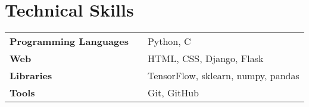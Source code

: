 \documentclass[10pt]{article}
\newenvironment{zitemize}{
\begin{itemize}\itemsep2pt \parskip0pt \parsep1pt}
{\end{itemize}\vspace{-0.5cm}}
\newcommand{\hskills}[1]{
\textbf{\bfseries #1} }
\begin{document}



\section{Technical Skills}
\begin{tabular}{p{11em} p{1em} p{43em}}
\hskills{Programming Languages }&  &  Python, C \\
\hskills{Web} &  & HTML, CSS, Django, Flask \\
\hskills{Libraries} &  & TensorFlow, sklearn, numpy, pandas \\
\hskills{Tools} &  & Git, GitHub \\

\end{tabular}
\vspace{-0.2cm}
\end{document}

